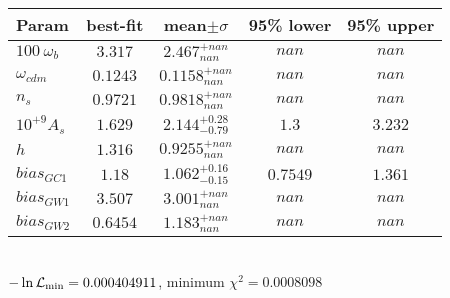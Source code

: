 \begin{tabular}{|l|c|c|c|c|} 
 \hline 
Param & best-fit & mean$\pm\sigma$ & 95\% lower & 95\% upper \\ \hline 
$100~\omega_{b }$ &$3.317$ & $2.467_{nan}^{+nan}$ & $nan$ & $nan$ \\ 
$\omega_{cdm }$ &$0.1243$ & $0.1158_{nan}^{+nan}$ & $nan$ & $nan$ \\ 
$n_{s }$ &$0.9721$ & $0.9818_{nan}^{+nan}$ & $nan$ & $nan$ \\ 
$10^{+9}A_{s }$ &$1.629$ & $2.144_{-0.79}^{+0.28}$ & $1.3$ & $3.232$ \\ 
$h$ &$1.316$ & $0.9255_{nan}^{+nan}$ & $nan$ & $nan$ \\ 
$bias_{GC 1 }$ &$1.18$ & $1.062_{-0.15}^{+0.16}$ & $0.7549$ & $1.361$ \\ 
$bias_{GW 1 }$ &$3.507$ & $3.001_{nan}^{+nan}$ & $nan$ & $nan$ \\ 
$bias_{GW 2 }$ &$0.6454$ & $1.183_{nan}^{+nan}$ & $nan$ & $nan$ \\ 
\hline 
 \end{tabular} \\ 
$-\ln{\cal L}_\mathrm{min} =0.000404911$, minimum $\chi^2=0.0008098$ \\ 
